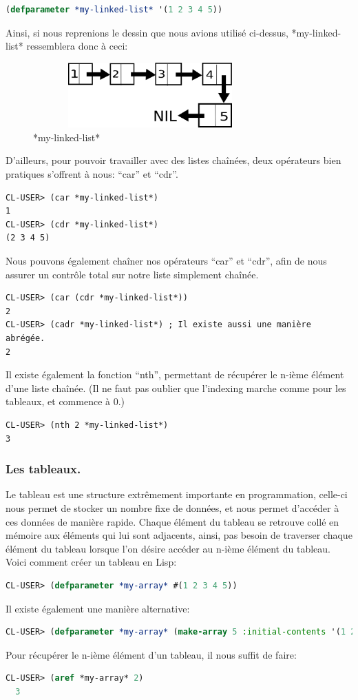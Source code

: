 \documentclass[a4paper, 12pt]{article}
\numberwithin{equation}{subsection}
\begin{document}
\begin{lstlisting}[language=Lisp]
(defparameter *my-linked-list* '(1 2 3 4 5))
\end{lstlisting}
Ainsi, si nous reprenions le dessin que nous avions utilisé ci-dessus,
*my-linked-list* ressemblera donc à ceci: \\
\begin{figure}[H]
  \centering
  \includegraphics[width=9.0cm, height=2.5cm]{imgs/my_linked_list.png}
  \caption{*my-linked-list*}
\end{figure}
D'ailleurs, pour pouvoir travailler avec des listes chaînées, deux opérateurs bien pratiques s'offrent à nous: ``car'' et ``cdr''. \\[0.2cm]
\begin{lstlisting}[language=LISP]
CL-USER> (car *my-linked-list*)
1
CL-USER> (cdr *my-linked-list*)
(2 3 4 5)
\end{lstlisting}
Nous pouvons également chaîner nos opérateurs ``car'' et ``cdr'', afin de nous assurer un contrôle total sur notre liste simplement chaînée.
\begin{lstlisting}[language=LISP]
CL-USER> (car (cdr *my-linked-list*))
2
CL-USER> (cadr *my-linked-list*) ; Il existe aussi une manière abrégée.
2
\end{lstlisting}
Il existe également la fonction ``nth'', permettant de récupérer le n-ième élément d'une liste chaînée. (Il ne faut pas oublier que l'indexing marche comme pour les tableaux, et commence à 0.)
\begin{lstlisting}[language=LISP]
CL-USER> (nth 2 *my-linked-list*)
3
\end{lstlisting}

\subsubsection{Les tableaux.}
Le tableau est une structure extrêmement importante en programmation,
celle-ci nous permet de stocker un nombre fixe de données, et nous permet d'accéder à ces données de manière rapide. Chaque élément du tableau se retrouve collé en mémoire aux éléments qui lui sont adjacents, ainsi, pas besoin de traverser chaque élément du tableau lorsque l'on désire accéder au n-ième élément du tableau. \\[0.2cm]
Voici comment créer un tableau en Lisp:
\begin{lstlisting}[language=Lisp]
  CL-USER> (defparameter *my-array* #(1 2 3 4 5))
\end{lstlisting}
Il existe également une manière alternative:
\begin{lstlisting}[language=Lisp]
  CL-USER> (defparameter *my-array* (make-array 5 :initial-contents '(1 2 3 4 5)))
\end{lstlisting}
Pour récupérer le n-ième élément d'un tableau, il nous suffit de faire:
\begin{lstlisting}[language=Lisp]
  CL-USER> (aref *my-array* 2)
  3
\end{lstlisting}
\end{document}
